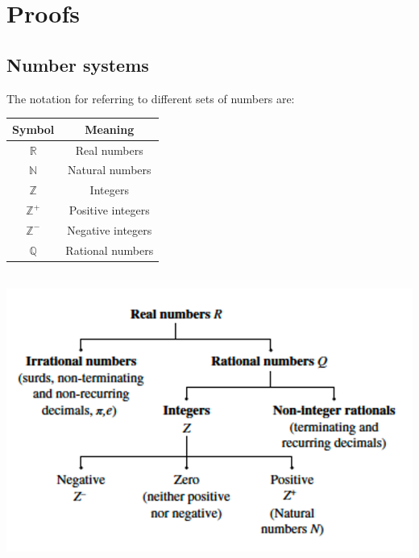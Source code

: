 \documentclass[a4paper,10pt]{report}
\begin{document}
\section{Proofs}
\subsection{Number systems}
The notation for referring to different sets of numbers are:
\begin{center}
	\begin{tabular}{c|c}
		Symbol           & Meaning           \\ \hline
		$\mathbb{R}$     & Real numbers      \\
		$\mathbb{N}$     & Natural numbers   \\
		$\mathbb{Z}$     & Integers          \\
		$\mathbb{Z}^{+}$ & Positive integers \\
		$\mathbb{Z}^{-}$ & Negative integers \\
		$\mathbb{Q}$     & Rational numbers
	\end{tabular}\\
	\includegraphics[scale=0.5]{number tree}
\end{center}
\end{document}
